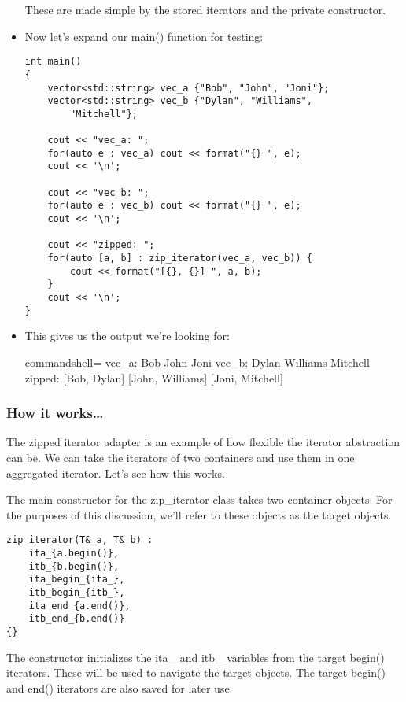 \begin{itemize}
These are made simple by the stored iterators and the private constructor.

\item 
Now let's expand our main() function for testing:

\begin{lstlisting}[style=styleCXX]
int main()
{
	vector<std::string> vec_a {"Bob", "John", "Joni"};
	vector<std::string> vec_b {"Dylan", "Williams",
		"Mitchell"};
	
	cout << "vec_a: ";
	for(auto e : vec_a) cout << format("{} ", e);
	cout << '\n';
	
	cout << "vec_b: ";
	for(auto e : vec_b) cout << format("{} ", e);
	cout << '\n';
	
	cout << "zipped: ";
	for(auto [a, b] : zip_iterator(vec_a, vec_b)) {
		cout << format("[{}, {}] ", a, b);
	}
	cout << '\n';
}
\end{lstlisting}


\item 
This gives us the output we're looking for:

\begin{tcblisting}{commandshell={}}
vec_a: Bob John Joni
vec_b: Dylan Williams Mitchell
zipped: [Bob, Dylan] [John, Williams] [Joni, Mitchell]
\end{tcblisting}

\end{itemize}

\subsubsection{How it works…}

The zipped iterator adapter is an example of how flexible the iterator abstraction can be.
We can take the iterators of two containers and use them in one aggregated iterator. Let's see how this works.

The main constructor for the zip\_iterator class takes two container objects. For the purposes of this discussion, we'll refer to these objects as the target objects.

\begin{lstlisting}[style=styleCXX]
zip_iterator(T& a, T& b) :
	ita_{a.begin()},
	itb_{b.begin()},
	ita_begin_{ita_},
	itb_begin_{itb_},
	ita_end_{a.end()},
	itb_end_{b.end()}
{}
\end{lstlisting}

The constructor initializes the ita\_ and itb\_ variables from the target begin() iterators. These will be used to navigate the target objects. The target begin() and end() iterators are also saved for later use.

